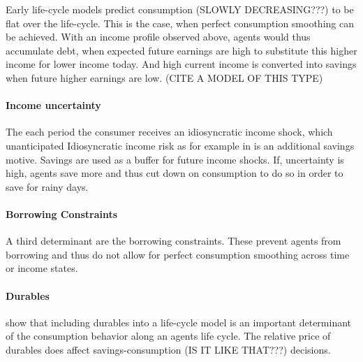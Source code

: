 \documentclass[a4paper,12pt]{article}
\begin{document}
Early life-cycle models predict consumption (SLOWLY DECREASING???) to be flat over the life-cycle. This is the case, when perfect consumption smoothing can be achieved. With an income profile observed above, agents would thus accumulate debt, when expected future earnings are high to substitute this higher income for lower income today. And high current income is converted into savings when future higher earnings are low. (CITE A MODEL OF THIS TYPE) 
\paragraph{Income uncertainty} The each period the consumer receives an idiosyncratic income shock, which unanticipated 
Idiosyncratic income risk as for example in \citep{aiyagari1994} is an additional savings motive. Savings are used as a buffer for future income shocks. If, uncertainty is high, agents save more and thus cut down on consumption to do so in order to save for rainy days. 
\paragraph{Borrowing Constraints} A third determinant are the borrowing constraints. These prevent agents from borrowing and thus do not allow for perfect consumption smoothing across time or income states. 
\paragraph{Durables} \citep{FV&K2011} show that including durables into a life-cycle model is an important determinant of the consumption behavior along an agents life cycle. The relative price of durables does affect savings-consumption (IS IT LIKE THAT???) decisions. 
\end{document}
